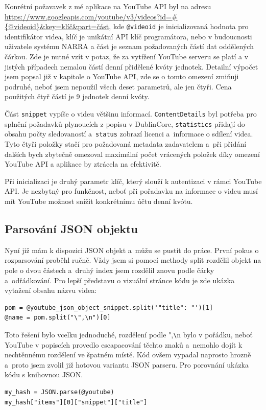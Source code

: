 \par Konrétní požavavek z mé aplikace na YouTube API byl na adresu \url{https://www.googleapis.com/youtube/v3/videos?id=#{@videoid}&key=klíč&part=část}\cite{apiurl}, kde \texttt{@videoid} je inicializovaná hodnota pro identifikátor videa, klíč je unikátní API klíč programátora, nebo v budoucnosti uživatele systému NARRA a část je seznam požadovaných částí dat oddělených čárkou. Zde je nutné vzít v potaz, že za vytížení YouTube serveru se platí a v jistých případech nemalou částí denní přidělené kvóty\cite{googleconsole1} jednotek. Detailní výpočet jsem popsal již v kapitole o YouTube API, zde se o tomto omezení zmiňuji podruhé, neboť jsem nepoužil všech deset parametrů, ale jen čtyři. Cena použitých čtyř částí je 9 jednotek denní kvóty.
\par Část \texttt{snippet} vypíše o videu většinu informací. \texttt{ContentDetails} byl potřeba pro splnění požadavků plynoucích z popisu v DublinCore, \texttt{statistics} přidají do obsahu počty sledovaností a~\texttt{status} zobrazí licenci a~informace o sdílení videa. Tyto čtyři položky stačí pro požadovaná metadata zadavatelem a~při přidání dalších bych zbytečně omezoval maximální počet vrácených položek díky omezení YouTube API a aplikace by ztrácela na efektivitě.
\par Při inicializaci je druhý parametr klíč, který slouží k autentizaci v rámci YouTube API. Je nezbytný pro funkčnost, neboť při pořadavku na informace o videu musí mít YouTube možnost snížit konkrétnímu účtu denní kvótu.

\subsection{Parsování JSON objektu}
\par Nyní již mám k dispozici JSON objekt a~můžu se pustit do práce. První pokus o rozparsování proběhl ručně. Vždy jsem si pomocí methody split rozdělil objekt na pole o dvou částech a~druhý index jsem rozdělil znovu podle čárky a~odřádkování. Pro lepší představu o vizuální stránce kódu je zde ukázka vytažení obsahu názvu videa:
\begin{verbatim}
pom = @youtube_json_object_snippet.split('"title": "')[1]
@name = pom.split("\",\n")[0]
\end{verbatim}
\par Toto řešení bylo vcelku jednoduché, rozdělení podle ",\verb|\|n bylo v pořádku, neboť YouTube v popiscích provedlo escapacování těchto znaků a~nemohlo dojít k nechtěnnému rozdělení ve špatném místě. Kód ovšem vypadal naprosto hrozně a~proto jsem zvolil již hotovou variantu JSON parseru. Pro porovnání ukázka kódu s knihovnou JSON.
\begin{verbatim}
my_hash = JSON.parse(@youtube)
my_hash["items"][0]["snippet"]["title"]
\end{verbatim}

